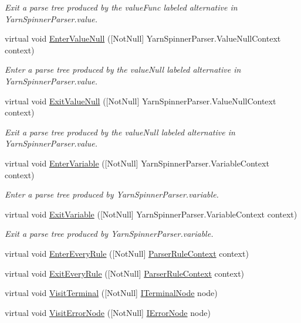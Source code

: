 \begin{DoxyCompactItemize}
\begin{DoxyCompactList}\small\item\em Exit a parse tree produced by the {\ttfamily value\-Func} labeled alternative in Yarn\-Spinner\-Parser.\-value. \end{DoxyCompactList}\item 
virtual void \hyperlink{a00196_aea9d4639edf6d5d016b70057ac8c4759}{Enter\-Value\-Null} (\mbox{[}Not\-Null\mbox{]} Yarn\-Spinner\-Parser.\-Value\-Null\-Context context)
\begin{DoxyCompactList}\small\item\em Enter a parse tree produced by the {\ttfamily value\-Null} labeled alternative in Yarn\-Spinner\-Parser.\-value. \end{DoxyCompactList}\item 
virtual void \hyperlink{a00196_a518cf1ada7b47f37d83e38c2abcc759d}{Exit\-Value\-Null} (\mbox{[}Not\-Null\mbox{]} Yarn\-Spinner\-Parser.\-Value\-Null\-Context context)
\begin{DoxyCompactList}\small\item\em Exit a parse tree produced by the {\ttfamily value\-Null} labeled alternative in Yarn\-Spinner\-Parser.\-value. \end{DoxyCompactList}\item 
virtual void \hyperlink{a00196_afaa8a2993d94e0e4460a69ef516e5849}{Enter\-Variable} (\mbox{[}Not\-Null\mbox{]} Yarn\-Spinner\-Parser.\-Variable\-Context context)
\begin{DoxyCompactList}\small\item\em Enter a parse tree produced by Yarn\-Spinner\-Parser.\-variable. \end{DoxyCompactList}\item 
virtual void \hyperlink{a00196_a2f4cf38483d1c434b0e0225b950f7a66}{Exit\-Variable} (\mbox{[}Not\-Null\mbox{]} Yarn\-Spinner\-Parser.\-Variable\-Context context)
\begin{DoxyCompactList}\small\item\em Exit a parse tree produced by Yarn\-Spinner\-Parser.\-variable. \end{DoxyCompactList}\item 
virtual void \hyperlink{a00196_a891c4119d1a34f4b7fa3994a8ab63188}{Enter\-Every\-Rule} (\mbox{[}Not\-Null\mbox{]} \hyperlink{a00319_a7e45f8222713cb764832fd3c69d0268f}{Parser\-Rule\-Context} context)
\item 
virtual void \hyperlink{a00196_adb4bf06fefa70949d705cf1fc4f9eafe}{Exit\-Every\-Rule} (\mbox{[}Not\-Null\mbox{]} \hyperlink{a00319_a7e45f8222713cb764832fd3c69d0268f}{Parser\-Rule\-Context} context)
\item 
virtual void \hyperlink{a00196_aa1dfd73e68ddef6754237fb33984fcf4}{Visit\-Terminal} (\mbox{[}Not\-Null\mbox{]} \hyperlink{a00319_a72f9ef657b5686a84acec94a9d7302d1}{I\-Terminal\-Node} node)
\item 
virtual void \hyperlink{a00196_a23c6fe6f098193795ac42544600dbb1a}{Visit\-Error\-Node} (\mbox{[}Not\-Null\mbox{]} \hyperlink{a00319_af5d51a3c18761c8348444279f29c7007}{I\-Error\-Node} node)
\end{DoxyCompactItemize}

